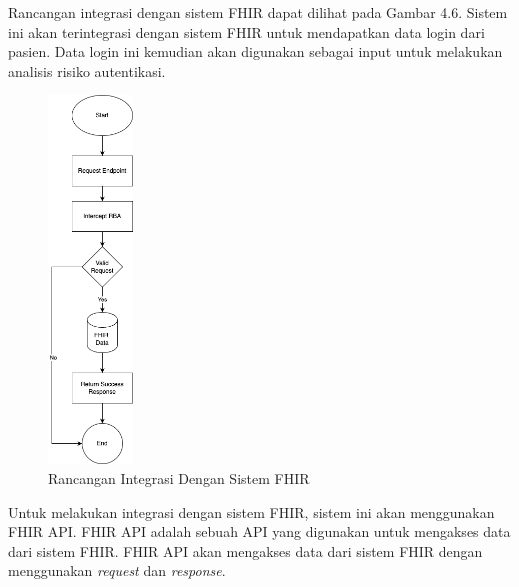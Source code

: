 Rancangan integrasi dengan sistem FHIR dapat dilihat pada Gambar 4.6. Sistem ini akan terintegrasi dengan sistem FHIR untuk mendapatkan data login dari pasien. Data login ini kemudian akan digunakan sebagai input untuk melakukan analisis risiko autentikasi.
\begin{figure}[H]
    \centering
    \includegraphics[width=0.2\textwidth]{BAB_TESIS/IMAGES/fhir-rba.drawio.png}
    \caption{Rancangan Integrasi Dengan Sistem FHIR}
    \label{fig:integrasi}
\end{figure}

Untuk melakukan integrasi dengan sistem FHIR, sistem ini akan menggunakan FHIR API. FHIR API adalah sebuah API yang digunakan untuk mengakses data dari sistem FHIR. FHIR API akan mengakses data dari sistem FHIR dengan menggunakan \textit{request} dan \textit{response}.
